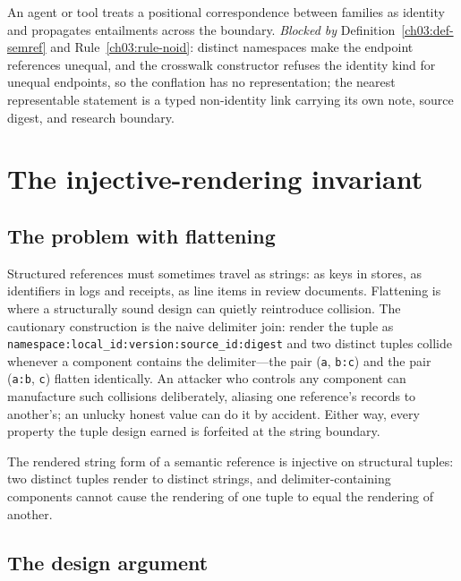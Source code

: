 \begin{threat}\label{ch03:threat-conflation}
An agent or tool treats a positional correspondence between
families as identity and propagates entailments across the
boundary. \emph{Blocked by} Definition~\ref{ch03:def-semref} and
Rule~\ref{ch03:rule-noid}: distinct namespaces make the endpoint
references unequal, and the crosswalk constructor refuses the
identity kind for unequal endpoints, so the conflation has no
representation; the nearest representable statement is a typed
non-identity link carrying its own note, source digest, and
research boundary.
\end{threat}

\section{The injective-rendering invariant}\label{ch03:injective}

\subsection{The problem with flattening}\label{ch03:flattening}

Structured references must sometimes travel as strings: as keys in
stores, as identifiers in logs and receipts, as line items in
review documents. Flattening is where a structurally sound design
can quietly reintroduce collision. The cautionary construction is
the naive delimiter join: render the tuple as
\texttt{namespace:local\_id:version:source\_id:digest} and two
distinct tuples collide whenever a component contains the
delimiter---the pair
(\texttt{a}, \texttt{b:c}) and the pair (\texttt{a:b}, \texttt{c})
flatten identically. An attacker who controls any component can
manufacture such collisions deliberately, aliasing one reference's
records to another's; an unlucky honest value can do it by
accident. Either way, every property the tuple design earned is
forfeited at the string boundary.

\begin{invariant}\label{ch03:inv-injective}
The rendered string form of a semantic reference is injective on
structural tuples: two distinct tuples render to distinct strings,
and delimiter-containing components cannot cause the rendering of
one tuple to equal the rendering of another.
\end{invariant}

\subsection{The design argument}\label{ch03:design-argument}

